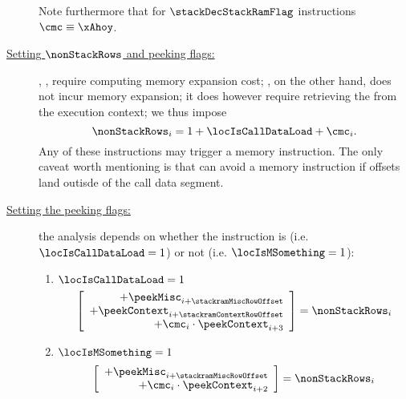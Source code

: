 \begin{description}
		\saNote{}
		Note furthermore that for $\stackDecStackRamFlag$ instructions $\cmc \equiv \xAhoy$.
	\item[\underline{Setting $\nonStackRows$ and peeking flags:}]
		,
		,
		require computing memory expansion cost;
		, on the other hand, does not incur memory expansion;
		it does however require retrieving the  from the execution context;
		we thus impose
		\[
			\nonStackRows_{i} =  1 + \locIsCallDataLoad + \cmc_{i}.
		\]
		\saNote{}
		Any of these instructions may trigger a memory instruction.
		The only caveat worth mentioning is that  can avoid a memory instruction if offsets land outisde of the call data segment.
	\item[\underline{Setting the peeking flags:}]
		the analysis depends on whether the instruction is  (i.e. $\locIsCallDataLoad = 1$) or not (i.e. $\locIsMSomething = 1$):
		\begin{enumerate}
			\item \If $\locIsCallDataLoad = 1$ \Then
				\[
					\left[ \begin{array}{r}
						+ \peekMisc                    _{i + \stackramMiscRowOffset} \\
						+ \peekContext                 _{i + \stackramContextRowOffset} \\
						+ \cmc_{i} \cdot \peekContext  _{i + 3} \\
					\end{array} \right] =
					\nonStackRows_{i}
				\]
			\item \If $\locIsMSomething = 1$ \Then
				\[
					\left[ \begin{array}{r}
						+ \peekMisc                    _{i + \stackramMiscRowOffset} \\
						+ \cmc_{i} \cdot \peekContext  _{i + 2} \\
					\end{array} \right]
					= \nonStackRows_{i}
				\]
		\end{enumerate}


\end{description}
